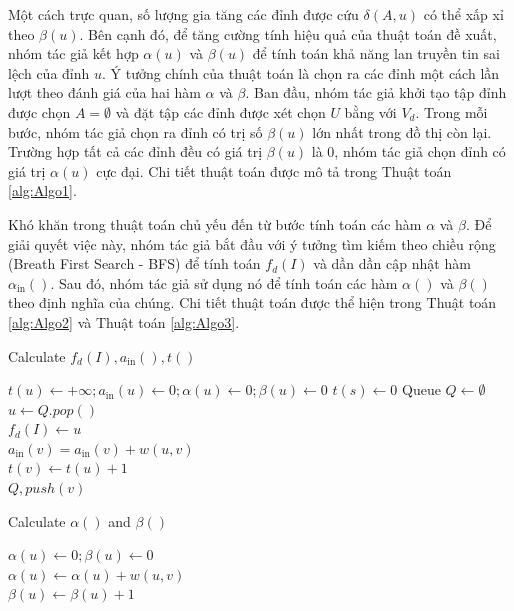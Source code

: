 Một cách trực quan, số lượng gia tăng các đỉnh được cứu $\delta(A, u)$ có thể xấp xỉ theo $\beta(u)$. Bên cạnh đó, để tăng cường tính hiệu quả của thuật toán đề xuất, nhóm tác giả kết hợp $\alpha(u)$ và $\beta(u)$ để tính toán khả năng lan truyền tin sai lệch của đỉnh $u$. Ý tưởng chính của thuật toán là chọn ra các đỉnh một cách lần lượt theo đánh giá của hai hàm $\alpha$ và $\beta$. Ban đầu, nhóm tác giả khởi tạo tập đỉnh được chọn $A=\emptyset$ và đặt tập các đỉnh được xét chọn $U$ bằng với $V_{d}$. Trong mỗi bước, nhóm tác giả chọn ra đỉnh có trị số $\beta(u)$ lớn nhất trong đồ thị còn lại. Trường hợp tất cả các đỉnh đều có giá trị $\beta(u)$ là 0, nhóm tác giả chọn đỉnh có giá trị $\alpha(u)$ cực đại. Chi tiết thuật toán được mô tả trong Thuật toán \ref{alg:Algo1}.

Khó khăn trong thuật toán chủ yếu đến từ bước tính toán các hàm $\alpha$ và $\beta$. Để giải quyết việc này, nhóm tác giả bắt đầu với ý tưởng tìm kiếm theo chiều rộng (Breath First Search - BFS) để tính toán $f_{d}(I)$ và dần dần cập nhật hàm $\alpha_{\text{in}}()$. Sau đó, nhóm tác giả sử dụng nó để tính toán các hàm  $\alpha()$ và $\beta()$ theo định nghĩa của chúng. Chi tiết thuật toán được thể hiện trong Thuật toán \ref{alg:Algo2} và Thuật toán \ref{alg:Algo3}.
\begin{algorithm}[hpt]
	\caption{Calculate $f_{d}(I), a_{\text{in}}(), t()$}
	\label{alg:Algo2}
	{
		$t(u) \gets +\infty; a_{\text{in}}(u) \gets 0; \alpha(u) \gets 0; \beta(u) \gets 0$
	}
	{
		$t(s) \gets 0$
	} 
	Queue $Q \gets \emptyset$
	\\
	{
		$u \gets Q.pop()$
		\\
		$f_{d}(I) \gets u$
		\\
		{
			{
				{
					$a_{\text{in}}(v)=a_{\text{in}}(v)+w(u,v)$
					\\
					{
						$t(v) \gets t(u)+1$
						\\
						$Q,push(v)$
					}
				}
			}
		}	
	}
\end{algorithm}

\begin{algorithm}[hpt]
	\caption{Calculate $\alpha()$ and $\beta()$}
	\label{alg:Algo3}
	{
		$\alpha(u) \gets 0; \beta(u) \gets 0$
		\\
		{
			{
				$\alpha(u) \gets \alpha(u)+w(u,v)$
				\\
				{
					$\beta(u) \gets \beta(u)+1$
				}
			}
		}
	}
\end{algorithm}

